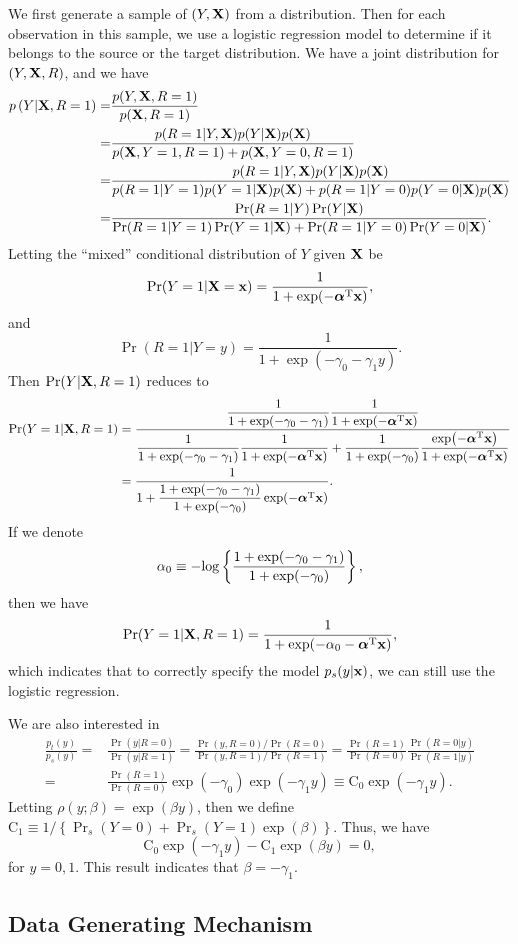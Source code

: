 \documentclass[12pt]{article}
\def\X{{\bf X}}
\def\x{{\bf x}}
\def\ba{{\boldsymbol\alpha}}
\def\trans{^{\rm T}}
\def\log{{\rm log}}
\begin{document}
We first generate a sample of $(Y,\X)$ from a distribution.
Then for each observation in this sample, we use a logistic regression model to determine if it belongs to the source or the target distribution.
We have a joint distribution for $(Y,\X,R)$, and we have
\[
\begin{split}
p\left(Y|\X,R=1\right)=&\frac{p(Y,\X,R=1)}{p(\X,R=1)}\\
=&\frac{p(R=1|Y,\X)p(Y|\X)p(\X)}{p(\X,Y=1,R=1)+p(\X,Y=0,R=1)}\\
=&\frac{p(R=1|Y,\X)p(Y|\X)p(\X)}{p(R=1|Y=1)p(Y=1|\X)p(\X)+p(R=1|Y=0)p(Y=0|\X)p(\X)}\\
=&\frac{\Pr(R=1|Y)\Pr(Y|\X)}{\Pr(R=1|Y=1)\Pr(Y=1|\X)+\Pr(R=1|Y=0)\Pr(Y=0|\X)}.
\end{split}
\]
Letting the ``mixed'' conditional distribution of $Y$ given $\X$ be
\[
\Pr(Y=1|\X=\x)=\frac{1}{1+\exp(-\ba\trans\x)},
\]
and
\[
\Pr(R=1|Y=y)=\frac{1}{1+\exp(-\gamma_0-\gamma_1y)}.
\]
Then $\Pr(Y|\X,R=1)$ reduces to
\[
\begin{split}
\Pr(Y=1|\X,R=1)&=\frac{\dfrac{1}{1+\exp(-\gamma_0-\gamma_1)}\dfrac{1}{1+\exp(-\ba\trans\x)}}{\dfrac{1}{1+\exp(-\gamma_0-\gamma_1)}\dfrac{1}{1+\exp(-\ba\trans\x)}+\dfrac{1}{1+\exp(-\gamma_0)}\dfrac{\exp(-\ba\trans\x)}{1+\exp(-\ba\trans\x)}}\\
&=\frac{1}{1+\dfrac{1+\exp(-\gamma_0-\gamma_1)}{1+\exp(-\gamma_0)}\exp(-\ba\trans\x)}.
\end{split}
\]
If we denote
\[
\alpha_0\equiv-\log\left\{\dfrac{1+\exp(-\gamma_0-\gamma_1)}{1+\exp(-\gamma_0)}\right\},
\]
then we have
\[
\Pr(Y=1|\X,R=1)=\frac{1}{1+\exp(-\alpha_0-\ba\trans\x)},
\]
which indicates that to correctly specify the model $p_s(y|\x)$, we can still use the logistic regression.

We are also interested in
\[
\begin{split}
\frac{p_t(y)}{p_s(y)}=&\frac{\Pr(y|R=0)}{\Pr(y|R=1)}=\frac{\Pr(y,R=0)/\Pr(R=0)}{\Pr(y,R=1)/\Pr(R=1)}=\frac{\Pr(R=1)}{\Pr(R=0)}\frac{\Pr(R=0|y)}{\Pr(R=1|y)}\\
=&\frac{\Pr(R=1)}{\Pr(R=0)}\exp(-\gamma_0)\exp(-\gamma_1y)\equiv\mathrm{C}_0\exp(-\gamma_1y).
\end{split}
\]
Letting $\rho(y;\beta)=\exp(\beta y)$, then we define $\mathrm{C}_1\equiv1/\left\{{\Pr}_{s}(Y=0)+{\Pr}_{s}(Y=1)\exp(\beta)\right\}$.
Thus, we have
\[
\mathrm{C}_0\exp(-\gamma_1 y)-\mathrm{C}_1\exp(\beta y)=0,
\]
for $y=0,1$.
This result indicates that $\beta=-\gamma_1$.

\subsection*{Data Generating Mechanism}



\newpage


\end{document}
